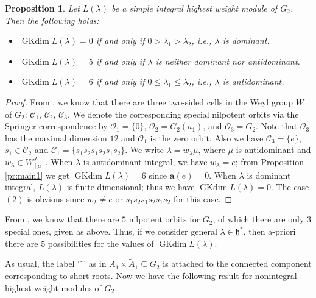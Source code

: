 \documentclass[reqno,12pt]{amsart}
\numberwithin{equation}{section}
\theoremstyle{plain}
\newtheorem{Prop}[Thm]{Proposition}
\theoremstyle{definition}
\newcommand{\lam}{\lambda}
\renewcommand{\subset}{\subseteq}
\newcommand{\aff}{ \mathbf{a} }
\newcommand{\gkd}{\operatorname{GKdim}}
\newcommand{\lest}{\leqslant}
\renewcommand{\leq}{\leqslant}
\begin{document}
\begin{Prop}\label{g2}
Let $L(\lam)$ be a simple integral highest weight module of $G_2$. Then
  the following holds:
    \begin{itemize}
        \item[(1)] $\gkd L(\lambda)=0$ if and only if $0>\lam_1 > \lam_2 $, i.e., $\lambda$ is dominant.
        \item[(2)] $\gkd L(\lambda)=5$ if and only if $\lambda$ is neither dominant nor antidominant.
         \item[(3)] $\gkd L(\lambda)=6$ if and only if $0\leq \lam_1\lest \lam_2 $, i.e., $\lambda$ is antidominant.  
    \end{itemize}
\end{Prop}
\begin{proof}
    From \cite[\S 4.8]{lusztig1984char}, we know that there are three two-sided cells in the Weyl group $W$ of $G_2$: $\mathcal{C}_1$, $\mathcal{C}_2$, $\mathcal{C}_3$. We denote the corresponding special nilpotent orbits via the Springer correspondence by $\mathcal{O}_1=\{0\}$, $\mathcal{O}_2=G_2(a_1)$, and $\mathcal{O}_3=G_2$. Note that $\mathcal{O}_3$ has the maximal dimension $12$ and $\mathcal{O}_1$ is the zero orbit. Also we have $ \mathcal{C}_3=\{e\}$, $s_{1}\in \mathcal{C}_2$ and $\mathcal{C}_1=\{s_{1}s_{2}s_{1}s_{2}s_{1}s_{2}\}$. We write $\lambda=w_{\lambda}\mu$, where $\mu$ is antidominant and $w_{\lambda}\in W_{[\mu]}^J$. When $\lambda$ is antidominant integral, we have $w_{\lambda}=e$; from Proposition \ref{pr:main1} we get $\gkd L(\lambda)=6$ since $\aff(e)=0$.  When $\lambda$ is dominant integral, $L(\lambda)$ is finite-dimensional; thus we have  $\gkd L(\lambda)=0$. The case $(2)$ is obvious since $w_{\lambda}\neq e$ or $s_{1}s_{2}s_{1}s_{2}s_{1}s_{2}$ for this case.  
\end{proof}


From \cite[\S 8.4]{CM}, we know that there are $5$ nilpotent orbits for $G_2$, of which there are only $3$ special ones, given as above. Thus, if we consider general $\lambda \in \mathfrak{h}^*$, then a-priori there are $5$ possibilities for the values of $\gkd L(\lambda)$.

As usual, the label $`\tilde{~}$' as in $A_1\times \tilde{A}_1\subset  G_2$  is attached to the connected component
corresponding to short roots.
Now we have the following result for nonintegral highest weight modules of $G_2$.
\end{document}
